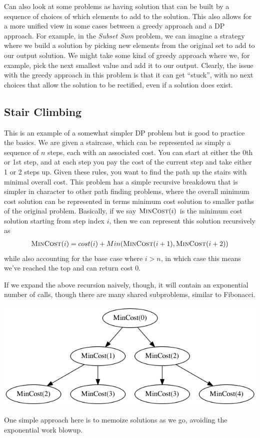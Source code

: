 \documentclass[10pt,a4paper]{article}
\begin{document}
Can also look at some problems as having solution that can be built by a sequence of choices of which elements to add to the solution. This also allows for a more unified view in some cases between a greedy approach and a DP approach. For example, in the \textit{Subset Sum} problem, we can imagine a strategy where we build a solution by picking new elements from the original set to add to our output solution. We might take some kind of greedy approach where we, for example, pick the next smallest value and add it to our output. Clearly, the issue with the greedy approach in this problem is that it can get ``stuck'', with no next choices that allow the solution to be rectified, even if a solution does exist.

\subsection*{Stair Climbing}

This is an example of a somewhat simpler DP problem but is good to practice the basics. We are given a staircase, which can be represented as simply a sequence of $n$ steps, each with an associated cost. You can start at either the 0th or 1st step, and at each step you pay the cost of the current step and take either 1 or 2 steps up. Given these rules, you want to find the path up the stairs with minimal overall cost. This problem has a simple recursive breakdown that is simpler in character to other path finding problems, where the overall minimum cost solution can be represented in terms minimum cost solution to smaller paths of the original problem. Basically, if we say $\textsc{MinCost}(i)$ is the minimum cost solution starting from step index $i$, then we can represent this solution recursively as
\begin{align*}
    \textsc{MinCost}(i) = cost(i) + Min(\textsc{MinCost}(i+1), \textsc{MinCost}(i+2))
\end{align*}
while also accounting for the base case where $i > n$, in which case this means we've reached the top and can return cost 0.

If we expand the above recursion naively, though, it will contain an exponential number of calls, though there are many shared subproblems, similar to Fibonacci.
\begin{center}
    \includegraphics[scale=0.35]{diagrams/stairs_tree.png}
\end{center}
One simple approach here is to memoize solutions as we go, avoiding the exponential work blowup.
\end{document}
